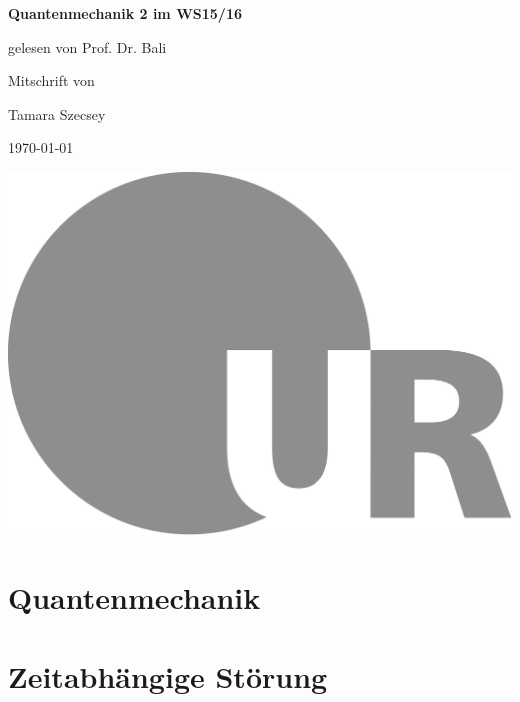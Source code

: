 \documentclass[ngerman, paper=a4, 12pt]{scrartcl}
\begin{document}
	\begin{titlepage}
		\begin{minipage}[c]{\textwidth}
			\begin{center}
				{ \Huge \textbf{Quantenmechanik 2 im WS15/16} }
				
				\vspace{1cm}
				{\Large{gelesen von Prof. Dr. Bali}}
				
				\vspace*{1cm}
				{\large Mitschrift von }
				
				\vspace*{0.2cm}
				{\Large Tamara Szecsey}
				
				\vspace*{1cm}
				{\large \today}
				
				\vspace*{3cm}
				\hspace*{1cm} \includegraphics[height=35ex]{LOGO_UR}
			\end{center}
		\end{minipage}
	\end{titlepage}
\tableofcontents
\newpage
\setcounter{section}{-1}
	\section{Quantenmechanik}
	
	
	
	
	\section{Zeitabhängige Störung}
	
	
	
	
	
	
	
\end{document}
